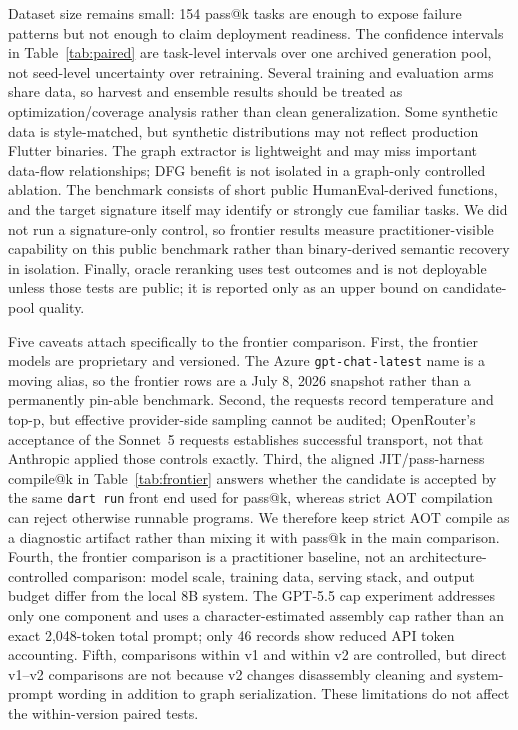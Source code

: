 \documentclass[11pt]{article}
\begin{document}
Dataset size remains small: 154 pass@k tasks are enough to expose failure patterns but not enough to claim deployment readiness. The confidence intervals in Table~\ref{tab:paired} are task-level intervals over one archived generation pool, not seed-level uncertainty over retraining. Several training and evaluation arms share data, so harvest and ensemble results should be treated as optimization/coverage analysis rather than clean generalization. Some synthetic data is style-matched, but synthetic distributions may not reflect production Flutter binaries. The graph extractor is lightweight and may miss important data-flow relationships; DFG benefit is not isolated in a graph-only controlled ablation. The benchmark consists of short public HumanEval-derived functions, and the target signature itself may identify or strongly cue familiar tasks. We did not run a signature-only control, so frontier results measure practitioner-visible capability on this public benchmark rather than binary-derived semantic recovery in isolation. Finally, oracle reranking uses test outcomes and is not deployable unless those tests are public; it is reported only as an upper bound on candidate-pool quality.

Five caveats attach specifically to the frontier comparison. First, the frontier models are proprietary and versioned. The Azure \texttt{gpt-chat-latest} name is a moving alias, so the frontier rows are a July 8, 2026 snapshot rather than a permanently pin-able benchmark. Second, the requests record temperature and top-p, but effective provider-side sampling cannot be audited; OpenRouter's acceptance of the Sonnet~5 requests establishes successful transport, not that Anthropic applied those controls exactly. Third, the aligned JIT/pass-harness compile@k in Table~\ref{tab:frontier} answers whether the candidate is accepted by the same \texttt{dart run} front end used for pass@k, whereas strict AOT compilation can reject otherwise runnable programs. We therefore keep strict AOT compile as a diagnostic artifact rather than mixing it with pass@k in the main comparison. Fourth, the frontier comparison is a practitioner baseline, not an architecture-controlled comparison: model scale, training data, serving stack, and output budget differ from the local 8B system. The GPT-5.5 cap experiment addresses only one component and uses a character-estimated assembly cap rather than an exact 2{,}048-token total prompt; only 46 records show reduced API token accounting. Fifth, comparisons within v1 and within v2 are controlled, but direct v1--v2 comparisons are not because v2 changes disassembly cleaning and system-prompt wording in addition to graph serialization. These limitations do not affect the within-version paired tests.
\end{document}
